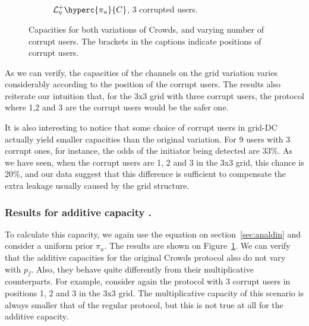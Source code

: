 \begin{figure}[ht]
\begin{subfigure}[b]{0.45\linewidth}
\caption{$\mathcal{L}^+_\forall\hyperc{\pi_u}{C}$, 3 corrupted users.}
\end{subfigure}
\caption{Capacities for both variations of Crowds, 
and varying number of corrupt users.
The brackets in the captions indicate positions of corrupt users.}
\label{figure:crgraph}
\end{figure}

As we can verify, the capacities of the channels on the grid variation varies 
considerably according to the position of the corrupt users. 
The results also reiterate our intuition that, for the 3x3 grid with three 
corrupt users, the protocol where 1,2 and 3 are the corrupt users would be the safer one.

It is also interesting to notice that some choice of corrupt users in grid-DC 
actually yield smaller capacities than the original variation.
For 9 users with 3 corrupt ones, for instance, the odds of 
the initiator being detected are 33\%. 
As we have seen, when the corrupt users are 1, 2 and 3 in the
3x3 grid, this chance is 20\%, and our data suggest that this difference is 
sufficient to compensate the extra leakage usually caused by the grid structure.


\subsubsection{Results for additive capacity%
.}

To calculate this capacity, we again use the equation on section~\ref{sec:analdin} and 
consider a uniform prior $\pi_u$. 
The results are shown on Figure~\ref{figure:crgraph}.
%
We can verify that the additive capacities for the original Crowds protocol also 
do not vary with $p_f$.
Also, they behave quite differently from their multiplicative counterparts. 
For example, consider again the protocol with 3 corrupt users in positions 1, 2 and 3 
in the 3x3 grid.
The multiplicative capacity of this scenario is always smaller that of the regular protocol, 
but this is not true at all for the additive capacity. 
